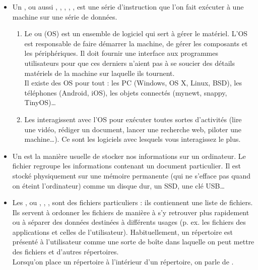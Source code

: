 \documentclass[10pt,a4paper]{report}
\begin{document}
\begin{itemize}
	\item Un , ou aussi , , , , , est une série d'instruction que l'on fait exécuter à une machine sur une série de données.
		\begin{enumerate}
			\item Le  ou  (OS) est un ensemble de logiciel qui sert à gérer le matériel. L'OS est responsable de faire démarrer la machine, de gérer les composants et les périphériques. Il doit fournir une interface aux programmes utilisateurs pour que ces derniers n'aient pas à se soucier des détails matériels de la machine sur laquelle ils tournent.\\[1ex]
			Il existe des OS pour tout : les PC (Windows, OS X, Linux, BSD), les téléphones (Android, iOS), les objets connectés (mynewt, snappy, TinyOS)\dots
			\item Les  interagissent avec l'OS pour exécuter toutes sortes d'activités (lire une vidéo, rédiger un document, lancer une recherche web, piloter une machine\dots). Ce sont les logiciels avec lesquels vous interagissez le plus.
		\end{enumerate}
	\item Un  est la manière usuelle de stocker nos informations sur un ordinateur. Le fichier regroupe les informations contenant un document particulier. Il est stocké physiquement sur une mémoire permanente (qui ne s'efface pas quand on éteint l'ordinateur) comme un disque dur, un SSD, une clé USB\dots
	\item Les , ou , , , sont des fichiers particuliers : ils contiennent une liste de fichiers. Ils servent à ordonner les fichiers de manière à s'y retrouver plus rapidement ou à séparer des données destinées à différents usages (p. ex. les fichiers des applications et celles de l'utilisateur). Habituellement, un répertoire est présenté à l'utilisateur comme une sorte de boîte dans laquelle on peut mettre des fichiers et d'autres répertoires. \\[1ex]
		Lorsqu'on place un répertoire à l'intérieur d'un répertoire, on parle de .
\end{itemize}

\end{document}
